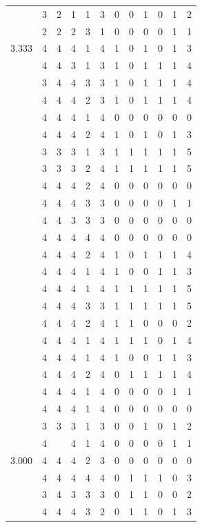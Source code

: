 \documentclass[]{book}
\theoremstyle{definition}
\theoremstyle{definition}
\theoremstyle{definition}
\theoremstyle{remark}
\begin{document}
\begin{table}
{\begin{tabular}[t]{rrrrrrrrrrrr}
 & 3 & 2 & 1 & 1 & 3 & 0 & 0 & 1 & 0 & 1 & 2\\
 & 2 & 2 & 2 & 3 & 1 & 0 & 0 & 0 & 0 & 1 & 1\\
3.333 & 4 & 4 & 4 & 1 & 4 & 1 & 0 & 1 & 0 & 1 & 3\\
 & 4 & 4 & 3 & 1 & 3 & 1 & 0 & 1 & 1 & 1 & 4\\
 & 3 & 4 & 4 & 3 & 3 & 1 & 0 & 1 & 1 & 1 & 4\\
 & 4 & 4 & 4 & 2 & 3 & 1 & 0 & 1 & 1 & 1 & 4\\
 & 4 & 4 & 4 & 1 & 4 & 0 & 0 & 0 & 0 & 0 & 0\\
 & 4 & 4 & 4 & 2 & 4 & 1 & 0 & 1 & 0 & 1 & 3\\
 & 3 & 3 & 3 & 1 & 3 & 1 & 1 & 1 & 1 & 1 & 5\\
 & 3 & 3 & 3 & 2 & 4 & 1 & 1 & 1 & 1 & 1 & 5\\
 & 4 & 4 & 4 & 2 & 4 & 0 & 0 & 0 & 0 & 0 & 0\\
 & 4 & 4 & 4 & 3 & 3 & 0 & 0 & 0 & 0 & 1 & 1\\
 & 4 & 4 & 3 & 3 & 3 & 0 & 0 & 0 & 0 & 0 & 0\\
 & 4 & 4 & 4 & 4 & 4 & 0 & 0 & 0 & 0 & 0 & 0\\
 & 4 & 4 & 4 & 2 & 4 & 1 & 0 & 1 & 1 & 1 & 4\\
 & 4 & 4 & 4 & 1 & 4 & 1 & 0 & 0 & 1 & 1 & 3\\
 & 4 & 4 & 4 & 1 & 4 & 1 & 1 & 1 & 1 & 1 & 5\\
 & 4 & 4 & 4 & 3 & 3 & 1 & 1 & 1 & 1 & 1 & 5\\
 & 4 & 4 & 4 & 2 & 4 & 1 & 1 & 0 & 0 & 0 & 2\\
 & 4 & 4 & 4 & 1 & 4 & 1 & 1 & 1 & 0 & 1 & 4\\
 & 4 & 4 & 4 & 1 & 4 & 1 & 0 & 0 & 1 & 1 & 3\\
 & 4 & 4 & 4 & 2 & 4 & 0 & 1 & 1 & 1 & 1 & 4\\
 & 4 & 4 & 4 & 1 & 4 & 0 & 0 & 0 & 0 & 1 & 1\\
 & 4 & 4 & 4 & 1 & 4 & 0 & 0 & 0 & 0 & 0 & 0\\
 & 3 & 3 & 3 & 1 & 3 & 0 & 0 & 1 & 0 & 1 & 2\\
 & 4 &  & 4 & 1 & 4 & 0 & 0 & 0 & 0 & 1 & 1\\
3.000 & 4 & 4 & 4 & 2 & 3 & 0 & 0 & 0 & 0 & 0 & 0\\
 & 4 & 4 & 4 & 4 & 4 & 0 & 1 & 1 & 1 & 0 & 3\\
 & 3 & 4 & 3 & 3 & 3 & 0 & 1 & 1 & 0 & 0 & 2\\
 & 4 & 4 & 4 & 3 & 2 & 0 & 1 & 1 & 0 & 1 & 3\\

\end{tabular}}
\end{table}
\end{document}
